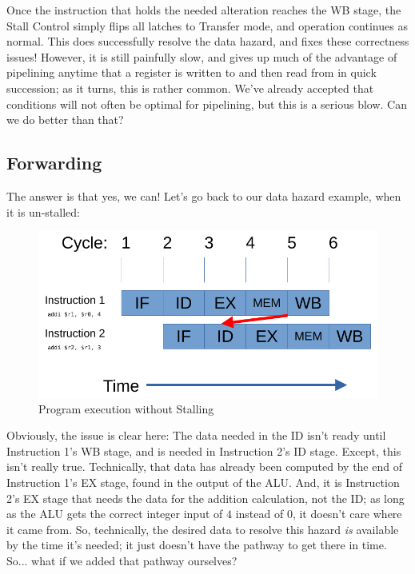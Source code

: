 \documentclass[12pt,twoside]{reedthesis}
\begin{document}
Once the instruction that holds the needed alteration reaches the WB stage, the Stall Control simply flips all latches to Transfer mode, and operation continues as normal. This does successfully resolve the data hazard, and fixes these correctness issues! However, it is still painfully slow, and gives up much of the advantage of pipelining anytime that a register is written to and then read from in quick succession; as it turns, this is rather common. We've already accepted that conditions will not often be optimal for pipelining, but this is a serious blow. Can we do better than that?

\subsection{Forwarding}

The answer is that yes, we can! Let's go back to our data hazard example, when it is un-stalled:

\begin{figure}[h!]

	\centering
	\includegraphics[scale=0.9]{nostall}
	\caption{Program execution without Stalling}
	\label{no-stall}
\end{figure}

Obviously, the issue is clear here: The data needed in the ID isn't ready until Instruction 1's WB stage, and is needed in Instruction 2's ID stage. Except, this isn't really true. Technically, that data has already been computed by the end of Instruction 1's EX stage, found in the output of the ALU. And, it is Instruction 2's EX stage that needs the data for the addition calculation, not the ID; as long as the ALU gets the correct integer input of $4$ instead of $0$, it doesn't care where it came from. So, technically, the desired data to resolve this hazard \textit{is} available by the time it's needed; it just doesn't have the pathway to get there in time. So... what if we added that pathway ourselves?
\end{document}
